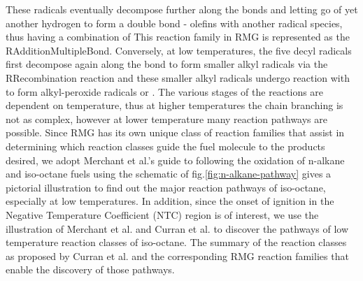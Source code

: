 These radicals eventually decompose further along the  bonds and letting go of yet another hydrogen to form a double bond - olefins with another radical species, thus having a combination of
This reaction family in RMG is represented as the R\textunderscore Addition\textunderscore MultipleBond.  Conversely, at low temperatures, the five decyl radicals first decompose again along the  bond to form smaller alkyl radicals via the R\textunderscore Recombination reaction and these smaller alkyl radicals undergo reaction with  to form alkyl-peroxide radicals or . The various stages of the reactions are dependent on temperature, thus at higher temperatures the chain branching is not as complex, however at lower temperature many reaction pathways are possible. Since RMG has its own unique class of reaction families that assist in determining which reaction classes guide the fuel molecule to the products desired, we adopt Merchant et al.'s \cite{Merchant2015UnderstandingPropane} guide to following the oxidation of n-alkane and iso-octane fuels using the schematic of fig.\ref{fig:n-alkane-pathway} gives a pictorial illustration to find out the major reaction pathways of iso-octane, especially at low temperatures. In addition, since the onset of ignition in the Negative Temperature Coefficient (NTC) region is of interest, we use the illustration of Merchant et al.\cite{Merchant2015UnderstandingPropane} and Curran et al.\cite{Curran2002AOxidationc} to discover the pathways of low temperature reaction classes of iso-octane. The summary of the reaction classes as proposed by Curran et al.\cite{Curran2002AOxidation} and the corresponding RMG reaction families that enable the discovery of those pathways.





